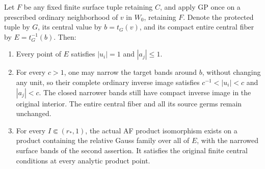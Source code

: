 \begin{lemma}
\label{lem:r13-fixed-controls-protected-fiber}
Let \(F\) be any fixed finite surface tuple retaining \(C\),
and apply GP once on a prescribed ordinary neighborhood of
\(v\) in \(W_0\), retaining \(F\).  Denote the protected
tuple by \(G\), its central value by \(b=t_G(v)\), and its
compact entire central fiber by \(E=t_G^{-1}(b)\).  Then:
\begin{enumerate}
\item Every point of \(E\) satisfies \(|u_i|=1\) and
\(|a_j|\leq1\).
\item For every \(c>1\), one may narrow the target bands
around \(b\), without changing any unit, so their complete
ordinary inverse image satisfies
\(c^{-1}<|u_i|<c\) and \(|a_j|<c\).  The closed narrower
bands still have compact inverse image in the original
interior.  The entire central fiber and all its source
germs remain unchanged.
\item For every \(I\Subset(r_*,1)\), the actual AF product
isomorphism exists on a product containing the relative
Gauss family over all of \(E\), with the narrowed surface
bands of the second assertion.  It satisfies the original
finite central conditions at every analytic product point.
\end{enumerate}
\end{lemma}


